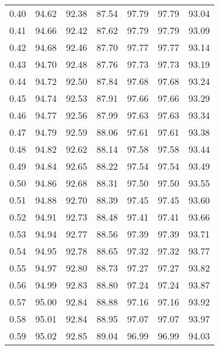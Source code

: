 \begin{tabular}{|c|c|c|c|c|c|c|}
      0.40 &     94.62 &     92.38 &      87.54 &   97.79 &      97.79 &         93.04 \\
      0.41 &     94.66 &     92.42 &      87.62 &   97.79 &      97.79 &         93.09 \\
      0.42 &     94.68 &     92.46 &      87.70 &   97.77 &      97.77 &         93.14 \\
      0.43 &     94.70 &     92.48 &      87.76 &   97.73 &      97.73 &         93.19 \\
      0.44 &     94.72 &     92.50 &      87.84 &   97.68 &      97.68 &         93.24 \\
      0.45 &     94.74 &     92.53 &      87.91 &   97.66 &      97.66 &         93.29 \\
      0.46 &     94.77 &     92.56 &      87.99 &   97.63 &      97.63 &         93.34 \\
      0.47 &     94.79 &     92.59 &      88.06 &   97.61 &      97.61 &         93.38 \\
      0.48 &     94.82 &     92.62 &      88.14 &   97.58 &      97.58 &         93.44 \\
      0.49 &     94.84 &     92.65 &      88.22 &   97.54 &      97.54 &         93.49 \\
      0.50 &     94.86 &     92.68 &      88.31 &   97.50 &      97.50 &         93.55 \\
      0.51 &     94.88 &     92.70 &      88.39 &   97.45 &      97.45 &         93.60 \\
      0.52 &     94.91 &     92.73 &      88.48 &   97.41 &      97.41 &         93.66 \\
      0.53 &     94.94 &     92.77 &      88.56 &   97.39 &      97.39 &         93.71 \\
      0.54 &     94.95 &     92.78 &      88.65 &   97.32 &      97.32 &         93.77 \\
      0.55 &     94.97 &     92.80 &      88.73 &   97.27 &      97.27 &         93.82 \\
      0.56 &     94.99 &     92.83 &      88.80 &   97.24 &      97.24 &         93.87 \\
      0.57 &     95.00 &     92.84 &      88.88 &   97.16 &      97.16 &         93.92 \\
      0.58 &     95.01 &     92.84 &      88.95 &   97.07 &      97.07 &         93.97 \\
      0.59 &     95.02 &     92.85 &      89.04 &   96.99 &      96.99 &         94.03 \\

\end{tabular}
